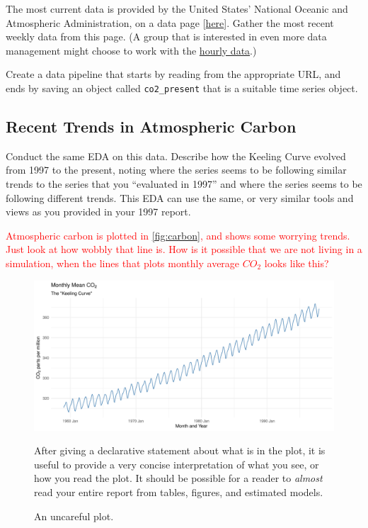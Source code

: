 \documentclass[AER]{AEA}
\begin{document}
The most current data is provided by the United States' National Oceanic
and Atmospheric Administration, on a data page
{[}\href{https://gml.noaa.gov/ccgg/trends/data.html}{here}{]}. Gather
the most recent weekly data from this page. (A group that is interested
in even more data management might choose to work with the
\href{https://gml.noaa.gov/aftp/data/trace_gases/co2/in-situ/surface/mlo/co2_mlo_surface-insitu_1_ccgg_HourlyData.txt}{hourly
data}.)

Create a data pipeline that starts by reading from the appropriate URL,
and ends by saving an object called \texttt{co2\_present} that is a
suitable time series object.

\hypertarget{recent-trends-in-atmospheric-carbon}{%
\subsection{Recent Trends in Atmospheric
Carbon}\label{recent-trends-in-atmospheric-carbon}}

Conduct the same EDA on this data. Describe how the Keeling Curve
evolved from 1997 to the present, noting where the series seems to be
following similar trends to the series that you ``evaluated in 1997''
and where the series seems to be following different trends. This EDA
can use the same, or very similar tools and views as you provided in
your 1997 report.

\textcolor{red}{Atmospheric carbon is plotted in \autoref{fig:carbon}, and shows some worrying trends. Just look at how wobbly that line is. How is it possible that we are not living in a simulation, when the lines that plots monthly average $CO_{2}$ looks like this?}

\begin{figure}
  \includegraphics[width=.8\linewidth]{./figures/plot_1.pdf}
  \caption{An uncareful plot.\label{fig:carbon}}
  \begin{figurenotes}
    After giving a declarative statement about what is in the plot, it is useful to provide a very concise interpretation of what you see, or how you read the plot. It should be possible for a reader to \textit{almost} read your entire report from tables, figures, and estimated models.
  \end{figurenotes}
\end{figure}
\end{document}
